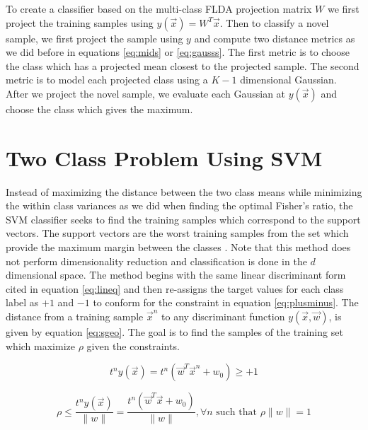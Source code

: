 \documentclass[journal]{IEEEtran}
\begin{document}
\par To create a classifier based on the multi-class FLDA projection matrix \(W\) we first project the training samples using \(y(\vec{x}) = W^T\vec{x}\). Then to classify a novel sample, we first project the sample using \(y\) and compute two distance metrics as we did before in equations \ref{eq:mids} or \ref{eq:gausss}. The first metric is to choose the class which has a projected mean closest to the projected sample. The second metric is to model each projected class using a \(K-1\) dimensional Gaussian. After we project the novel sample, we evaluate each Gaussian at \(y(\vec{x})\) and choose the class which gives the maximum.

\section{Two Class Problem Using SVM}
\par Instead of maximizing the distance between the two class means while minimizing the within class variances as we did when finding the optimal Fisher's ratio, the SVM classifier seeks to find the training samples which correspond to the support vectors. The support vectors are the worst training samples from the set which provide the maximum margin between the classes \cite[p.~218]{alpaydin}. Note that this method does not perform dimensionality reduction and classification is done in the \(d\) dimensional space. The method begins with the same linear discriminant form cited in equation \ref{eq:lineq} and then re-assigns the target values for each class label as \(+1\) and \(-1\) to conform for the constraint in equation \ref{eq:plusminus}. The distance from a training sample \(\vec{x}^n\) to any discriminant function \(y(\vec{x}, \vec{w})\), is given by equation \ref{eq:sgeo}. The goal is to find the samples of the training set which maximize \(\rho\) given the constraints.

\begin{equation}
\label{eq:plusminus}
t^ny(\vec{x}) = t^n(\vec{w}^T\vec{x}^n + w_0) \ge +1
\end{equation} 

\begin{equation}
\label{eq:sgeo}
\rho \le \frac{t^ny(\vec{x})}{\|w\|} = \frac{t^n(\vec{w}^T\vec{x} + w_0)}{\|w\|}, \forall{n} \text{ such that } \rho\|w\| = 1
\end{equation} 
\end{document}
